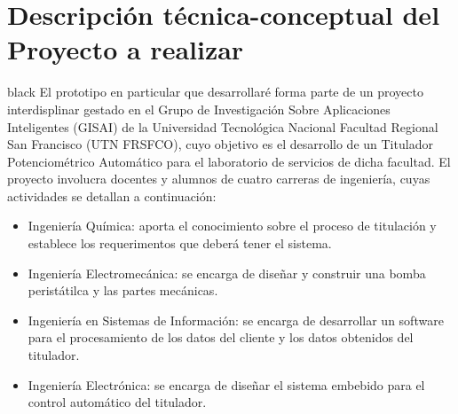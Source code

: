 \documentclass[11pt]{charter}
\begin{document}
\section{Descripción técnica-conceptual del Proyecto a realizar}
\label{sec:descripcion}

\begin{consigna}{black}
El prototipo en particular que desarrollaré forma parte de un proyecto interdisplinar gestado en el Grupo de Investigación Sobre Aplicaciones Inteligentes (GISAI) de la Universidad Tecnológica Nacional Facultad Regional San Francisco (UTN FRSFCO), cuyo objetivo es el desarrollo de un Titulador Potenciométrico Automático para el laboratorio de servicios de dicha facultad. El proyecto involucra docentes y alumnos de cuatro carreras de ingeniería, cuyas actividades se detallan a continuación:
\begin{itemize}
	\item Ingeniería Química: aporta el conocimiento sobre el proceso de titulación y establece los requerimentos que deberá tener el sistema. 
	\item Ingeniería Electromecánica: se encarga de diseñar y construir una bomba peristátilca y las partes mecánicas. 
	\item Ingeniería en Sistemas de Información: se encarga de desarrollar un software para el procesamiento de los datos del cliente y los datos obtenidos del titulador. 
	\item Ingeniería Electrónica: se encarga de diseñar el sistema embebido para el control automático del titulador. 
\end{itemize}

\end{consigna}
\end{document}
